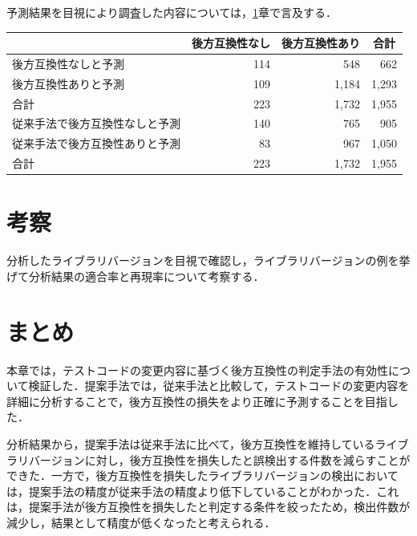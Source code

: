 \documentclass[11pt,dvipdfmx]{jreport}
\begin{document}
予測結果を目視により調査した内容については，\ref{rq2:kousatu}章で言及する．

\begin{table}[]
  \centering
  \label{fig:result}
  \begin{tabular}{l|r|r|r}
    \hline
                    & \multicolumn{1}{c|}{後方互換性なし} & \multicolumn{1}{c|}{後方互換性あり} & \multicolumn{1}{c}{合計} \\ \hline
    後方互換性なしと予測      & 114                          & 548                          & 662                    \\ \hline
    後方互換性ありと予測      & 109                          & 1,184                        & 1,293                  \\ \hline
    合計              & 223                          & 1,732                        & 1,955                  \\ \hline\hline
    従来手法で後方互換性なしと予測 & 140                          & 765                          & 905                    \\ \hline
    従来手法で後方互換性ありと予測 & 83                           & 967                          & 1,050                  \\ \hline
    合計              & 223                          & 1,732                        & 1,955                  \\ \hline
  \end{tabular}
\end{table}


\section{考察}\label{rq2:kousatu}
分析したライブラリバージョンを目視で確認し，ライブラリバージョンの例を挙げて分析結果の適合率と再現率について考察する．


\section{まとめ}
本章では，テストコードの変更内容に基づく後方互換性の判定手法の有効性について検証した．提案手法では，従来手法と比較して，テストコードの変更内容を詳細に分析することで，後方互換性の損失をより正確に予測することを目指した．

分析結果から，提案手法は従来手法に比べて，後方互換性を維持しているライブラリバージョンに対し，後方互換性を損失したと誤検出する件数を減らすことができた．一方で，後方互換性を損失したライブラリバージョンの検出においては，提案手法の精度が従来手法の精度より低下していることがわかった．これは，提案手法が後方互換性を損失したと判定する条件を絞ったため，検出件数が減少し，結果として精度が低くなったと考えられる．
\end{document}
